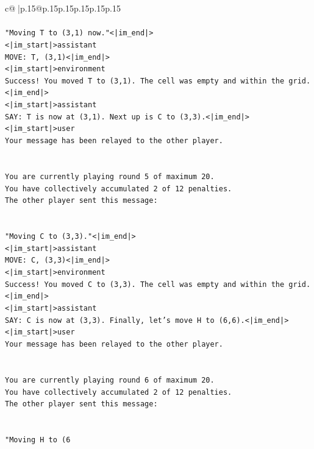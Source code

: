 \documentclass{article}
\begin{document}
{\begin{supertabular}{c@{$\;$}|p{.15\linewidth}@{}p{.15\linewidth}p{.15\linewidth}p{.15\linewidth}p{.15\linewidth}p{.15\linewidth}}
{{{\\ 
\\ 
\texttt{"Moving T to (3,1) now."<|im\_end|>} \\
\texttt{<|im\_start|>assistant} \\
\texttt{MOVE: T, (3,1)<|im\_end|>} \\
\texttt{<|im\_start|>environment} \\
\texttt{Success! You moved T to (3,1). The cell was empty and within the grid.<|im\_end|>} \\
\texttt{<|im\_start|>assistant} \\
\texttt{SAY: T is now at (3,1). Next up is C to (3,3).<|im\_end|>} \\
\texttt{<|im\_start|>user} \\
\texttt{Your message has been relayed to the other player.} \\
\\ 
\\ 
\texttt{You are currently playing round 5 of maximum 20.} \\
\texttt{You have collectively accumulated 2 of 12 penalties.} \\
\texttt{The other player sent this message:} \\
\\ 
\\ 
\texttt{"Moving C to (3,3)."<|im\_end|>} \\
\texttt{<|im\_start|>assistant} \\
\texttt{MOVE: C, (3,3)<|im\_end|>} \\
\texttt{<|im\_start|>environment} \\
\texttt{Success! You moved C to (3,3). The cell was empty and within the grid.<|im\_end|>} \\
\texttt{<|im\_start|>assistant} \\
\texttt{SAY: C is now at (3,3). Finally, let's move H to (6,6).<|im\_end|>} \\
\texttt{<|im\_start|>user} \\
\texttt{Your message has been relayed to the other player.} \\
\\ 
\\ 
\texttt{You are currently playing round 6 of maximum 20.} \\
\texttt{You have collectively accumulated 2 of 12 penalties.} \\
\texttt{The other player sent this message:} \\
\\ 
\\ 
\texttt{"Moving H to (6} \\
            }
        }
    }
     \\ \\


\end{supertabular}}
\end{document}
